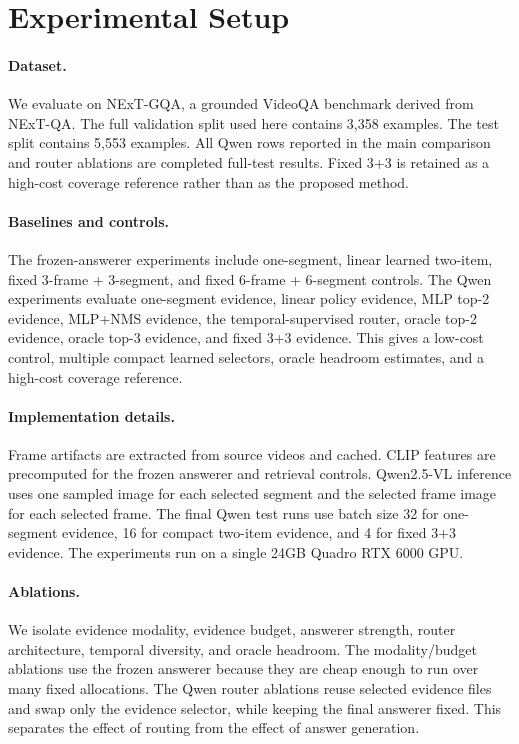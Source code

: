 \documentclass{article}
\begin{document}
\section{Experimental Setup}
\paragraph{Dataset.}
We evaluate on NExT-GQA, a grounded VideoQA benchmark derived from NExT-QA. The full validation split used here contains 3,358 examples. The test split contains 5,553 examples. All Qwen rows reported in the main comparison and router ablations are completed full-test results. Fixed 3+3 is retained as a high-cost coverage reference rather than as the proposed method.

\paragraph{Baselines and controls.}
The frozen-answerer experiments include one-segment, linear learned two-item, fixed 3-frame + 3-segment, and fixed 6-frame + 6-segment controls. The Qwen experiments evaluate one-segment evidence, linear policy evidence, MLP top-2 evidence, MLP+NMS evidence, the temporal-supervised router, oracle top-2 evidence, oracle top-3 evidence, and fixed 3+3 evidence. This gives a low-cost control, multiple compact learned selectors, oracle headroom estimates, and a high-cost coverage reference.

\paragraph{Implementation details.}
Frame artifacts are extracted from source videos and cached. CLIP features are precomputed for the frozen answerer and retrieval controls. Qwen2.5-VL inference uses one sampled image for each selected segment and the selected frame image for each selected frame. The final Qwen test runs use batch size 32 for one-segment evidence, 16 for compact two-item evidence, and 4 for fixed 3+3 evidence. The experiments run on a single 24GB Quadro RTX 6000 GPU.

\paragraph{Ablations.}
We isolate evidence modality, evidence budget, answerer strength, router architecture, temporal diversity, and oracle headroom. The modality/budget ablations use the frozen answerer because they are cheap enough to run over many fixed allocations. The Qwen router ablations reuse selected evidence files and swap only the evidence selector, while keeping the final answerer fixed. This separates the effect of routing from the effect of answer generation.
\end{document}
